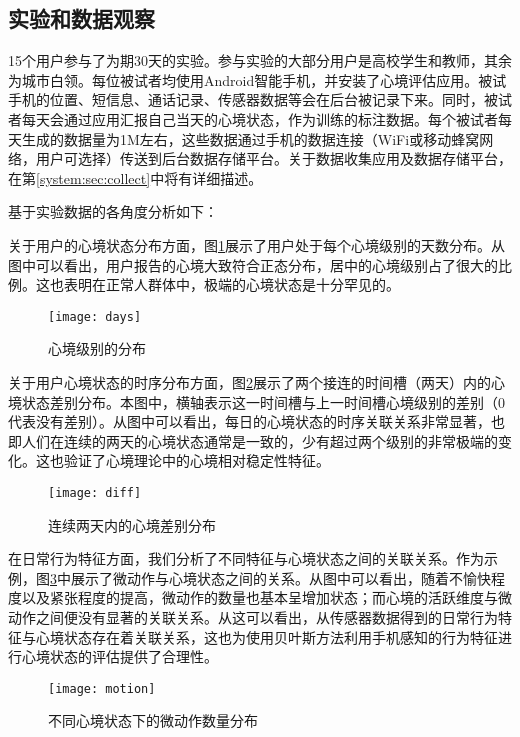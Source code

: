 \subsection{实验和数据观察}
\label{mood:sec:DataAndObservation}

15个用户参与了为期30天的实验。参与实验的大部分用户是高校学生和教师，其余为城市白领。每位被试者均使用Android智能手机，并安装了心境评估应用。被试手机的位置、短信息、通话记录、传感器数据等会在后台被记录下来。同时，被试者每天会通过应用汇报自己当天的心境状态，作为训练的标注数据。每个被试者每天生成的数据量为1M左右，这些数据通过手机的数据连接（WiFi或移动蜂窝网络，用户可选择）传送到后台数据存储平台。关于数据收集应用及数据存储平台，在第\ref{system:sec:collect}中将有详细描述。

基于实验数据的各角度分析如下：

关于用户的心境状态分布方面，图\ref{mood:fig:mooddist}展示了用户处于每个心境级别的天数分布。从图中可以看出，用户报告的心境大致符合正态分布，居中的心境级别占了很大的比例。这也表明在正常人群体中，极端的心境状态是十分罕见的。

\begin{figure}[htbp]
  \centering
    \texttt{[image: days]}
  \caption{心境级别的分布}
  \label{mood:fig:mooddist}
\end{figure}

关于用户心境状态的时序分布方面，图\ref{mood:fig:moodcorr}展示了两个接连的时间槽（两天）内的心境状态差别分布。本图中，横轴表示这一时间槽与上一时间槽心境级别的差别（0代表没有差别）。从图中可以看出，每日的心境状态的时序关联关系非常显著，也即人们在连续的两天的心境状态通常是一致的，少有超过两个级别的非常极端的变化。这也验证了心境理论中的心境相对稳定性特征。
\begin{figure}[htbp]
  \centering
    \texttt{[image: diff]}
  \caption{连续两天内的心境差别分布}
  \label{mood:fig:moodcorr}
\end{figure}

在日常行为特征方面，我们分析了不同特征与心境状态之间的关联关系。作为示例，图\ref{mood:fig:minormotion}中展示了微动作与心境状态之间的关系。从图中可以看出，随着不愉快程度以及紧张程度的提高，微动作的数量也基本呈增加状态；而心境的活跃维度与微动作之间便没有显著的关联关系。从这可以看出，从传感器数据得到的日常行为特征与心境状态存在着关联关系，这也为使用贝叶斯方法利用手机感知的行为特征进行心境状态的评估提供了合理性。

\begin{figure}[htbp]
  \centering
    \texttt{[image: motion]}
  \caption{不同心境状态下的微动作数量分布}
  \label{mood:fig:minormotion}
\end{figure}

